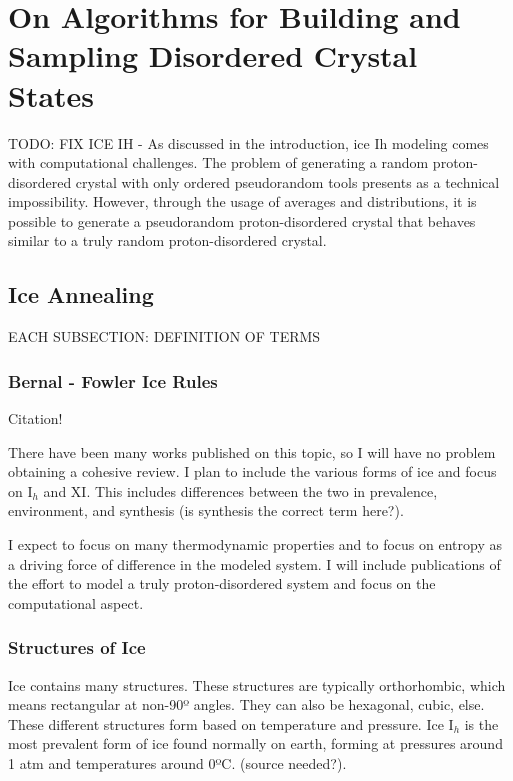 \chapter{On Algorithms for Building and Sampling Disordered Crystal States}
\label{ch:iceXI}

TODO: FIX ICE IH -
As discussed in the introduction, ice Ih modeling comes with computational challenges. 
The problem of generating a random proton-disordered crystal with only ordered pseudorandom tools presents as a technical impossibility. 
However, through the usage of averages and distributions, it is possible to generate a pseudorandom proton-disordered crystal that behaves similar to a truly random proton-disordered crystal.


\section{Ice Annealing}

EACH SUBSECTION: DEFINITION OF TERMS

\subsection{Bernal - Fowler Ice Rules}

Citation! \cite{BFIceOG}

There have been many works published on this topic, so I will have no problem obtaining a cohesive review. I plan to include the various forms of ice and focus on I$_{h}$ and XI. This includes differences between the two in prevalence, environment, and synthesis (is synthesis the correct term here?). 

I expect to focus on many thermodynamic properties and to focus on entropy as a driving force of difference in the modeled system. I will include publications of the effort to model a truly proton-disordered system and focus on the computational aspect. 

\subsection{Structures of Ice}

Ice contains many structures.
These structures are typically orthorhombic, which means rectangular at non-90º angles.
They can also be hexagonal, cubic, else. 
These different structures form based on temperature and pressure. 
Ice I$_{h}$ is the most prevalent form of ice found normally on earth, forming at pressures around 1 atm and temperatures around 0ºC. (source needed?).

